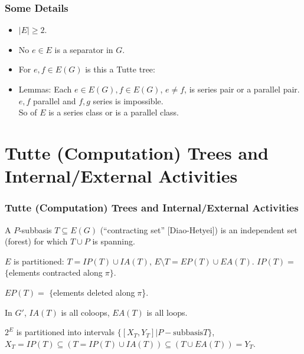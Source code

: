 \documentclass{beamer}
\begin{document}
\begin{frame}
\frametitle{Some Details}
\begin{itemize}
\item $|E|\geq 2$.
\item
No $e\in E$ is a separator in $G$.
\item
For  $e,f\in E(G)$ is this a Tutte tree:

\item
Lemmas: Each $e\in E(G),f\in E(G)$, $e\neq f$, 
is series pair or a parallel pair.\\
$e,f$ parallel and $f,g$ series is impossible.\\
So  of $E$ is a series class or is a parallel class.
\end{itemize}
\end{frame}


\section{Tutte (Computation) Trees and Internal/External Activities}
\begin{frame}
\frametitle{Tutte (Computation) Trees and Internal/External Activities}
A {$P$-subbasis $T\subseteq E(G)$ 
(``contracting set'' [Diao-Hetyei])}
is an independent set (forest) for which 
$T\cup P$ is spanning.



$E$ is partitioned: $T=IP(T)\cup IA(T)$, 
$E\setminus T=EP(T)\cup EA(T)$.  $IP(T)=$ $\{$elements contracted 
along$\;\pi\}$.  

$EP(T)=$ $\{$elements deleted along$\;\pi$\}.  

In $G'$, $IA(T)$ is all coloops, $EA(T)$ is all loops.

$2^E$ is partitioned into intervals 
$\{[X_T,Y_T]|P-\text{subbasis} T\}$,
$X_T=IP(T)\subseteq (T=IP(T)\cup IA(T))\subseteq (T\cup EA(T))=Y_T$.
\vfill
{}
\end{frame}
\end{document}
